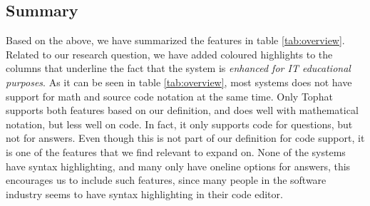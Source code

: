 \subsection{Summary}
Based on the above, we have summarized the features in table \ref{tab:overview}. Related to our research question, we have added coloured highlights to the columns that underline the fact that the system is \emph{enhanced for IT educational purposes}. As it can be seen in table \ref{tab:overview}, most systems does not have support for math and source code notation at the same time. Only Tophat supports both features based on our definition, and does well with mathematical notation, but less well on code. In fact, it only supports code for questions, but not for answers. Even though this is not part of our definition for code support, it is one of the features that we find relevant to expand on.
None of the systems have syntax highlighting, and many only have oneline options for answers, this encourages us to include such features, since many people in the software industry seems to have syntax highlighting in their code editor.






